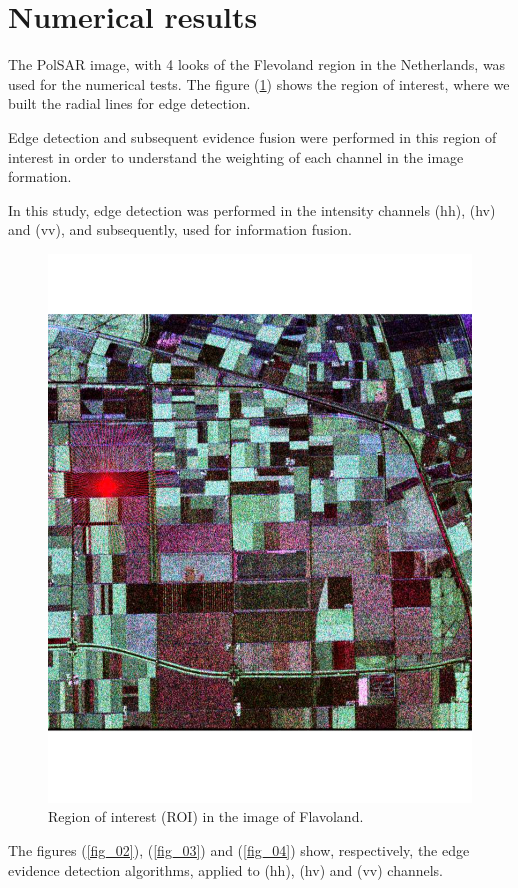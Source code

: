 \documentclass[conference]{IEEEtran}
\begin{document}
{{{{\section{Numerical results}\label{sec_07}
The PolSAR image, with 4 looks of the Flevoland region in the Netherlands, was used for the numerical tests. The figure (\ref{fig_01}) shows the region of interest, where we built the radial lines for edge detection.

 Edge detection and subsequent evidence fusion were performed in this region of interest in order to understand the weighting of each channel in the image formation.

In this study, edge detection was performed in the intensity channels (hh), (hv) and (vv), and subsequently, used for information fusion. 

\begin{figure}[hbt]
\centering
	\includegraphics[scale=0.3]{flevoland_radial_4_look.pdf}
			\vspace{-1.0cm}
	\caption{Region of interest (ROI) in the image of Flavoland.}
\label{fig_01}
\end{figure}
The figures (\ref{fig_02}), (\ref{fig_03}) and (\ref{fig_04}) show, respectively, the edge evidence detection algorithms, applied to (hh), (hv) and (vv) channels. 

}}}}
\end{document}
